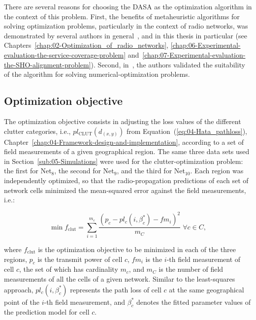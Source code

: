 There are several reasons for choosing the DASA as the optimization
algorithm in the context of this problem. First, the benefits of metaheuristic
algorithms for solving optimization problems, particularly in the
context of radio networks, was demonstrated by several authors in
general~\cite{Benedicic_Balancing_downlink_uplink_soft_handover_areas_in_UMTS_networks:2012,Garcia-Lozano_Metaheuristic_procedure_to_optimize_transmission_delays_in_DVB-T_single_frequency_networks:2011,Huang_Online_propagation_model_correction_based_on_PSO_algorithm_in_LTE_SON_system:2012,Malla_Energy_efficient_resource_allocation_in_OFDMA_networks_using_ant_colony_optimization:2012},
and in this thesis in particular (see Chapters~\ref{chap:02-Optimization_of_radio_networks},
\ref{chap:06-Experimental-evaluation-the-service-coverage-problem}
and~\ref{chap:07-Experimental-evaluation-the-SHO-alignment-problem}).
Second, in~\cite{Korosec-The_differential_ant_stigmergy_algorithm:2012},
the authors validated the suitability of the algorithm for solving
numerical-optimization problems.


\subsection{Optimization objective \label{sub:Optimization-objective}}

The optimization objective consists in adjusting the loss values of
the different clutter categories, i.e., $pl_{\mathrm{CLUT}}(d_{(x,y)})$
from Equation~(\ref{eq:04-Hata_pathloss}), Chapter~\ref{chap:04-Framework-design-and-implementation},
according to a set of field measurements of a given geographical region.
The same three data sets used in Section~\ref{sub:05-Simulations}
were used for the clutter-optimization problem: the first for Net$_{8}$,
the second for Net$_{9}$, and the third for Net$_{10}$. Each region
was independently optimized, so that the radio-propagation predictions
of each set of network cells minimized the mean-squared error against
the field measurements, i.e.:

\begin{equation}
\min f_{\mathrm{clut}}=\sum_{i=1}^{m_{c}}\frac{(p_{c}-pl_{c}(i,\beta_{c}^{*})-fm_{i})^{2}}{m_{C}}\;\forall c\in C,\label{eq:05-Mean-squared_error}
\end{equation}


\noindent where $f_{\mathrm{clut}}$ is the optimization objective
to be minimized in each of the three regions, $p_{c}$ is the transmit
power of cell $c$, $fm_{i}$ is the $i$-th field measurement of
cell $c$, the set of which has cardinality $m_{c}$, and $m_{C}$
is the number of field measurements of all the cells of a given network.
Similar to the least-squares approach, $pl_{c}(i,\beta_{c}^{*})$
represents the path loss of cell $c$ at the same geographical point
of the $i$-th field measurement, and $\beta_{c}^{*}$ denotes the
fitted parameter values of the prediction model for cell $c$.

